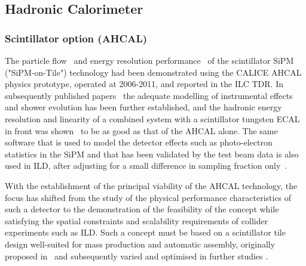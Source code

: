 \subsection{Hadronic Calorimeter}
\label{ild:sec:HCAL}

\subsubsection{Scintillator option (AHCAL)}

The particle flow~\cite{Adloff:2011ha} and energy resolution performance~\cite{Adloff:2012gv} of the scintillator SiPM ("SiPM-on-Tile") technology had been demonstrated using the CALICE AHCAL physics prototype, operated at 2006-2011, and reported in the ILC TDR. In subsequently published papers~\cite{Adloff:2013vra,Adloff:2013kio,Adloff:2013jqa,Adloff:2014rya,Bilki:2014bga,Lucaci-Timoce:2013tkf,Price:2016sce} the adequate modelling of instrumental effects and shower evolution has been further established, and the hadronic energy resolution and linearity of a combined system with a scintillator tungsten ECAL in front was shown~\cite{Repond:2018flg} to be as good as that of the AHCAL alone. The same software that is used to model the detector effects such as photo-electron statistics in the SiPM and that has been validated by the test beam data is also used in ILD, after adjusting for a small difference in sampling fraction only~\cite{Hartbrich:2016bbz}.

With the establishment of the principal viability of the AHCAL technology, the focus has shifted from the study of the physical performance characteristics of such a detector to the demonstration of the feasibility of the concept while satisfying the spatial constraints and scalability requirements of collider experiments such as ILD. Such a concept must be based on a scintillator tile design well-suited for mass production and automatic assembly, originally proposed in~\cite{Blazey:2009zz} and subsequently varied and optimised in further studies \cite{Simon:2010hf, Liu:2015cpe}. 

